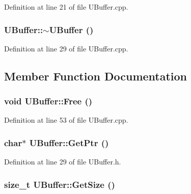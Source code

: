 Definition at line 21 of file UBuffer.cpp.\hypertarget{class_u_buffer_799c169f9d7aaa79ec60df93d985df52}{
\subsubsection[{$\sim$UBuffer}]{\setlength{\rightskip}{0pt plus 5cm}UBuffer::$\sim$UBuffer ()}}
\label{class_u_buffer_799c169f9d7aaa79ec60df93d985df52}




Definition at line 29 of file UBuffer.cpp.

\subsection{Member Function Documentation}
\hypertarget{class_u_buffer_785592f1792b7bdf20294628da84c8d7}{
\subsubsection[{Free}]{\setlength{\rightskip}{0pt plus 5cm}void UBuffer::Free ()}}
\label{class_u_buffer_785592f1792b7bdf20294628da84c8d7}




Definition at line 53 of file UBuffer.cpp.\hypertarget{class_u_buffer_1b9175d37e8a140a439e5e1db4dea010}{
\subsubsection[{GetPtr}]{\setlength{\rightskip}{0pt plus 5cm}char$\ast$ UBuffer::GetPtr ()}}
\label{class_u_buffer_1b9175d37e8a140a439e5e1db4dea010}




Definition at line 29 of file UBuffer.h.\hypertarget{class_u_buffer_d1f01266203b801a0578f54a45404fd4}{
\subsubsection[{GetSize}]{\setlength{\rightskip}{0pt plus 5cm}size\_\-t UBuffer::GetSize ()}}
\label{class_u_buffer_d1f01266203b801a0578f54a45404fd4}





